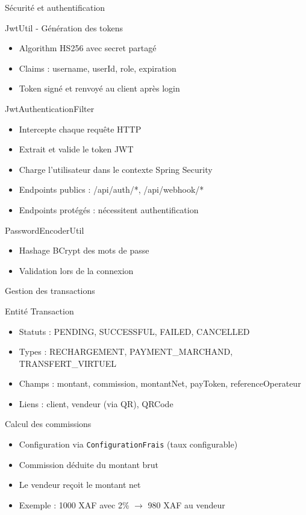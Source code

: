 \documentclass[aspectratio=169,9pt,demo]{beamer}
\begin{document}
\begin{frame}{Sécurité et authentification}
\begin{block}{JwtUtil - Génération des tokens}
\begin{itemize}
    \item Algorithm HS256 avec secret partagé
    \item Claims : username, userId, role, expiration
    \item Token signé et renvoyé au client après login
\end{itemize}
\end{block}

\begin{block}{JwtAuthenticationFilter}
\begin{itemize}
    \item Intercepte chaque requête HTTP
    \item Extrait et valide le token JWT
    \item Charge l'utilisateur dans le contexte Spring Security
    \item Endpoints publics : /api/auth/*, /api/webhook/*
    \item Endpoints protégés : nécessitent authentification
\end{itemize}
\end{block}

\begin{block}{PasswordEncoderUtil}
\begin{itemize}
    \item Hashage BCrypt des mots de passe
    \item Validation lors de la connexion
\end{itemize}
\end{block}
\end{frame}

\begin{frame}{Gestion des transactions}
\begin{block}{Entité Transaction}
\begin{itemize}
    \item Statuts : PENDING, SUCCESSFUL, FAILED, CANCELLED
    \item Types : RECHARGEMENT, PAYMENT\_MARCHAND, TRANSFERT\_VIRTUEL
    \item Champs : montant, commission, montantNet, payToken, referenceOperateur
    \item Liens : client, vendeur (via QR), QRCode
\end{itemize}
\end{block}

\begin{block}{Calcul des commissions}
\begin{itemize}
    \item Configuration via \texttt{ConfigurationFrais} (taux configurable)
    \item Commission déduite du montant brut
    \item Le vendeur reçoit le montant net
    \item Exemple : 1000 XAF avec 2\% $\rightarrow$ 980 XAF au vendeur
\end{itemize}
\end{block}
\end{frame}
\end{document}
